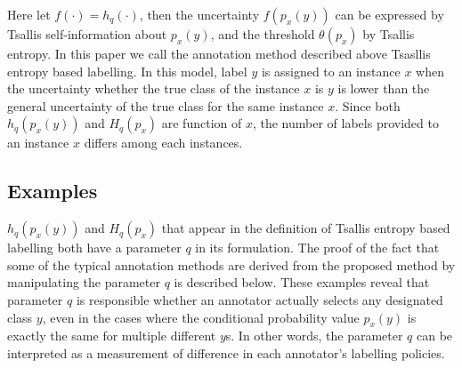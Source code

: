 \documentclass[a4paper,conference]{IEEEtran}
\begin{document}
Here let $f(\cdot)=h_{q}(\cdot)$, then the uncertainty $f(p_{x}(y))$ can be expressed by Tsallis self-information about $p_{x}(y)$, and the threshold $\theta(p_{x})$ by Tsallis entropy.
In this paper we call the annotation method described above Tsasllis entropy based labelling.
In this model, label $y$ is assigned to an instance $x$ when the uncertainty whether the true class of the instance $x$ is $y$ is lower than the general uncertainty of the true class for the same instance $x$.  
Since both $h_{q}(p_{x}(y))$ and $H_{q}(p_{x})$ are function of $x$, the number of labels provided to an instance $x$ differs among each instances.

\subsection{Examples}\label{subsec:example_models}
$h_{q}(p_{x}(y))$ and $H_{q}(p_{x})$ that appear in the definition of Tsallis entropy based labelling both have a parameter $q$ in its formulation.
The proof of the fact that some of the typical annotation methods are derived from the proposed method by manipulating the parameter $q$ is described below.
These examples reveal that parameter $q$ is responsible whether an annotator actually selects any designated class $y$, even in the cases where the conditional probability value $p_{x}(y)$ is exactly the same for multiple different $y$s.
In other words, the parameter $q$ can be interpreted as a measurement of difference in each annotator's labelling policies.
\end{document}
